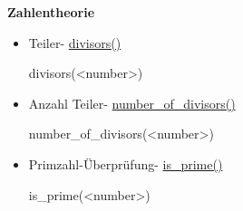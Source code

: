 \documentclass[a4paper,9pt,DIV15,twocolumn]{scrartcl}
\begin{document}
\textbf{Zahlentheorie}
\begin{itemize}
    \item Teiler- \href{https://sage.math.uni-goettingen.de/doc/static/reference/sage/rings/arith.html#sage.rings.arith.divisors}{divisors()}
\begin{sagein}
divisors(<number>)
\end{sagein}
\item Anzahl Teiler- \href{https://sage.math.uni-goettingen.de/doc/static/reference/sage/rings/arith.html#sage.rings.arith.number_of_divisors}{number\_of\_divisors()}
\begin{sagein}
number_of_divisors(<number>)
\end{sagein}
    \item Primzahl-Überprüfung- \href{https://sage.math.uni-goettingen.de/doc/static/reference/sage/rings/arith.html#sage.rings.arith.is_prime}{is\_prime()}
\begin{sagein} 
is_prime(<number>)
\end{sagein}
\end{itemize}
\end{document}
